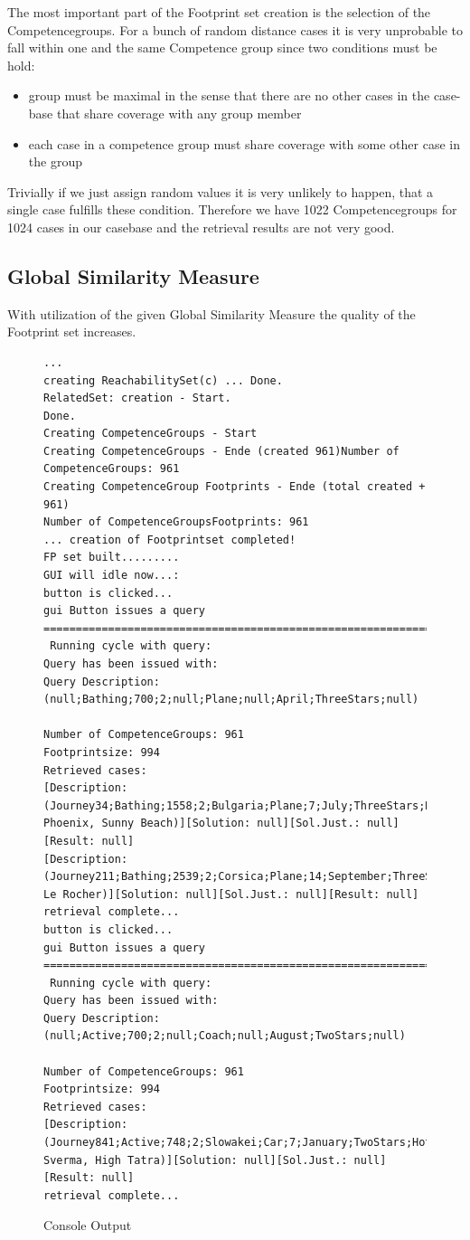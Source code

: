 \documentclass[11pt]{article}
\begin{document}
The most important part of the Footprint set creation is the selection of the Competencegroups. For a bunch of random distance cases it is very unprobable to fall within one and the same Competence group since two conditions must be hold:
\begin{itemize}
\item{group must be maximal in the sense that there are no other cases in the case-base that share coverage with any group member}
\item{each case in a competence group must share coverage with some other case in the group}
\end{itemize}
Trivially if we just assign random values it is very unlikely to happen, that a single case fulfills these condition. Therefore we have 1022 Competencegroups for 1024 cases in our casebase and the retrieval results are not very good.

\subsection{Global Similarity Measure}
With utilization of the given Global Similarity Measure the quality of the Footprint set increases.

\begin{figure}[h]
\begin{verbatim}
...
creating ReachabilitySet(c) ... Done.
RelatedSet: creation - Start.
Done.
Creating CompetenceGroups - Start
Creating CompetenceGroups - Ende (created 961)Number of CompetenceGroups: 961
Creating CompetenceGroup Footprints - Ende (total created + 961)
Number of CompetenceGroupsFootprints: 961
... creation of Footprintset completed!
FP set built.........
GUI will idle now...:
button is clicked...
gui Button issues a query
===========================================================================
 Running cycle with query:
Query has been issued with:
Query Description:
(null;Bathing;700;2;null;Plane;null;April;ThreeStars;null)

Number of CompetenceGroups: 961
Footprintsize: 994
Retrieved cases:
[Description: (Journey34;Bathing;1558;2;Bulgaria;Plane;7;July;ThreeStars;Hotel Phoenix, Sunny Beach)][Solution: null][Sol.Just.: null][Result: null]
[Description: (Journey211;Bathing;2539;2;Corsica;Plane;14;September;ThreeStars;Studios Le Rocher)][Solution: null][Sol.Just.: null][Result: null]
retrieval complete...
button is clicked...
gui Button issues a query
===========================================================================
 Running cycle with query:
Query has been issued with:
Query Description:
(null;Active;700;2;null;Coach;null;August;TwoStars;null)

Number of CompetenceGroups: 961
Footprintsize: 994
Retrieved cases:
[Description: (Journey841;Active;748;2;Slowakei;Car;7;January;TwoStars;Hotel Sverma, High Tatra)][Solution: null][Sol.Just.: null][Result: null]
retrieval complete...
\end{verbatim}
\caption{Console Output}
\label{fig:output}
\end{figure}
\end{document}
